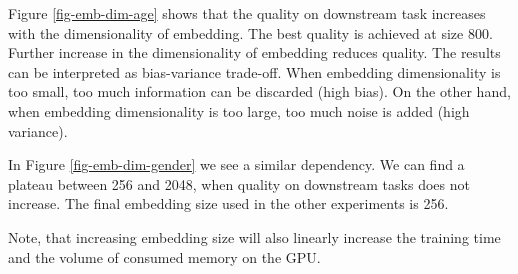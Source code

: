 \documentclass{article}
\begin{document}
Figure \ref{fig-emb-dim-age} shows that the quality on downstream task increases with the dimensionality of embedding. The best quality is achieved at size 800. Further increase in the dimensionality of embedding reduces quality.
The results can be interpreted as bias-variance trade-off. When embedding dimensionality is too small, too much information can be discarded (high bias). On the other hand, when embedding dimensionality is too large, too much noise is added (high variance).

In Figure \ref{fig-emb-dim-gender} we see a similar dependency. We can find a plateau between 256 and 2048, when quality on downstream tasks does not increase. The final embedding size used in the other experiments is 256.

Note, that increasing embedding size will also linearly increase the training time and the volume of consumed memory on the GPU.





\end{document}
